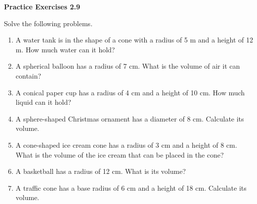  \vspace{1ex}
\noindent\textbf{Practice Exercises 2.9}

\vspace{0.75ex}

Solve the following problems.
\begin{enumerate}[noitemsep, label = \color{blue}\arabic*. ]
    \item A water tank is in the shape of a cone with a radius of 5 m and a height of 12 m. How much water can it hold?
    \item A spherical balloon has a radius of 7 cm. What is the volume of air it can contain?
    \item A conical paper cup has a radius of 4 cm and a height of 10 cm. How much liquid can it hold?
    \item A sphere-shaped Christmas ornament has a diameter of 8 cm. Calculate its volume.
    \item A cone-shaped ice cream cone has a radius of 3 cm and a height of 8 cm. What is the volume of the ice cream that can be placed in the cone?
    \item A basketball has a radius of 12 cm. What is its volume?
    \item A traffic cone has a base radius of 6 cm and a height of 18 cm. Calculate its volume.
\end{enumerate}
